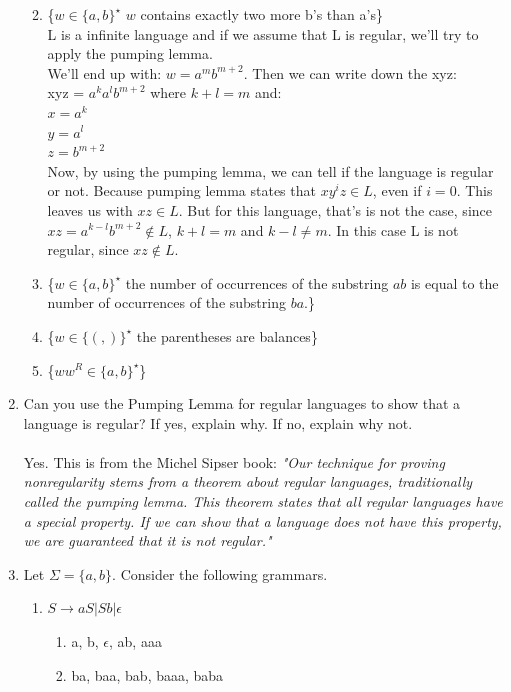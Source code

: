 \documentclass{article}
\begin{document}
\begin{enumerate}
\begin{enumerate}[label=(\alph*)]
\begin{figure}[H]
				\caption{}
				\label{fig:5d}
			\end{figure}
			\item \{$w \in \{ a,b \}^{\star}$ $w$ contains exactly two more b's than a's\}\\
			L is a infinite language and if we assume that L is regular, we'll try to apply the pumping lemma. \\
			We'll end up with: $w = a^mb^{m+2}$. Then we can write down the xyz:\\
			xyz = $a^ka^lb^{m+2}$ where $k + l = m$ and:\\
			$x = a^k$\\
			$y = a^l$\\
			$z = b^{m+2}$\\
			Now, by using the pumping lemma, we can tell if the language is regular or not. Because pumping lemma states that $xy^iz \in L$, even if $i=0$. This leaves us with $xz \in L$. But for this language, that's is not the case, since $xz = a^{k-l}b^{m+2} \notin L$, $k + l = m$ and $k - l \neq m$. In this case L is not regular, since $xz \notin L$.
			\item \{$w \in \{ a,b \}^{\star}$ the number of occurrences of the substring $ab$ is equal to the number of occurrences of the substring $ba$.\}
			\item \{$w \in \{(,)\}^{\star}$  the parentheses are balances\}
			\item \{$ww^R \in \{a,b\}^\star$\}
		\end{enumerate}
		\item Can you use the Pumping Lemma for regular languages to show that a language is regular? If yes, explain why. If no, explain why not. \\~\\
		Yes. This is from the Michel Sipser book: \textit{"Our technique for proving nonregularity stems from a theorem about regular
		languages, traditionally called the pumping lemma. This theorem states that all
		regular languages have a special property. If we can show that a language does
		not have this property, we are guaranteed that it is not regular."}
		\item Let $\Sigma = \{a,b\}$. Consider the following grammars.
		 \begin{enumerate}[label=(\alph*)]
		 	\item $S \rightarrow aS|Sb|\epsilon$
		 	\begin{enumerate}
		 		\item a, b, $\epsilon$, ab, aaa
		 		\item ba, baa, bab, baaa, baba

\end{enumerate}
\end{enumerate}
\end{enumerate}
\end{document}
